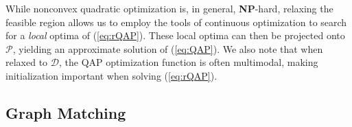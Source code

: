 \documentclass[10pt]{article}
\providecommand{\mc}[1]{\mathcal{#1}}
\providecommand{\mc}[1]{\mathcal{#1}}
\begin{document}
While nonconvex quadratic optimization is, in general, {\bf NP}-hard, relaxing the feasible region allows us to employ the tools of continuous optimization to
search for a \emph{local} optima of (\ref{eq:rQAP}).  These local optima can then be projected onto $\mc{P}$, yielding an approximate solution of (\ref{eq:QAP}).
We also note that when relaxed to $\mc{D}$, the QAP optimization function is often multimodal, making initialization important when solving (\ref{eq:rQAP}).  




\subsection{Graph Matching} %
\label{sec:GM}
\end{document}
